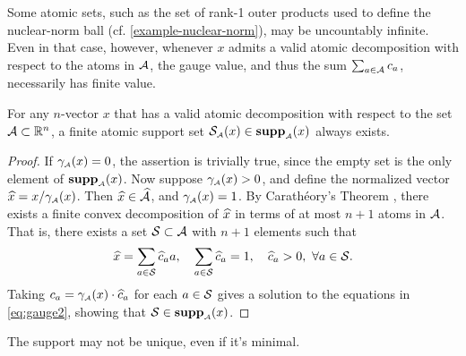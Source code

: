   Some atomic sets, such as the set of rank-1 outer products used to define the
  nuclear-norm ball (cf. \autoref{example-nuclear-norm}), may be uncountably
  infinite. Even in that case, however, whenever $x$ admits a valid atomic decomposition with respect
  to the atoms in $\mathcal{A}$, the gauge value, and thus the sum
  $\sum_{a\in\mathcal{A}}c_a$, necessarily has finite value. 

  \begin{proposition}
    For any $n$-vector $x$ that has a valid atomic decomposition with respect to the set
    $\mathcal{A}\subset\mathbb{R}^n$, a finite atomic support set $\operatorname{\mathcal{S}_{\scriptscriptstyle\mathcal{A}}}(x)\in\operatorname{\hbox{\rm\textbf{supp}}}_{\scriptscriptstyle\mathcal{A}}(x)$ always exists.
  \end{proposition}

  \begin{proof}
    If $\gamma_{\scriptscriptstyle\mathcal{A}}(x)=0$, the assertion is trivially true, since the
    empty set is the only element of $\operatorname{\hbox{\rm\textbf{supp}}}_{\scriptscriptstyle\mathcal{A}}(x)$. Now suppose
    $\gamma_{\scriptscriptstyle\mathcal{A}}(x)>0$, and define the normalized vector
    $\xhat=x/\gauge\As(x)$. Then $\xhat\in\convA$, and
    $\gamma_{\scriptscriptstyle\mathcal{A}}(x)=1$. By Carath\'eory's Theorem
    \cite[Theorem~17.1]{rockafellar1970convex}, there exists a finite
    convex decomposition of $\xhat$ in terms of at most $n+1$ atoms in
    $\mathcal{A}$. That is, there exists a set $\mathcal{S}\subset\mathcal{A}$ with $n+1$
    elements such that
    \[
      \xhat = \sum_{a\in\Sscr}\chat_aa,
      \quad
      \sum_{a\in\Sscr}\chat_a = 1,
      \quad
      \chat_a>0,\ \forall a\in\Sscr.
    \]
    Taking $c_a=\gauge\As(x)\cdot\chat_a$ for each $a\in\mathcal{S}$ gives a solution  to the equations in \eqref{eq:gauge2}, showing that $\mathcal{S}\in\operatorname{\hbox{\rm\textbf{supp}}}_{\scriptscriptstyle\mathcal{A}}(x)$.
  \end{proof}

  The support may not be unique, even if it's minimal.

